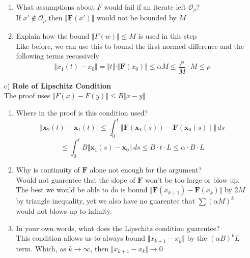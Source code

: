 \documentclass[12pt]{article}
\begin{document}
\begin{enumerate}
\begin{enumerate}
        \item What assumptions about $F$ would fail if an iterate left $\mathcal{O}_{\rho}$?\\
        If $x' \notin \mathcal{O}_{\rho}$ then $\Vert \mathbf{F}(x') \Vert$ would not be bounded by $M$

        \item Explain how the bound $\Vert F(w) \Vert \leq M$ is used in this step \\
        Like before, we can use this to bound the first normed difference and the following terms recussively
        \[\Vert x_1(t) - x_0 \Vert = \Vert t \Vert \cdot \Vert \mathbf{F}(x_0) \Vert \leq \alpha M \leq \frac{\rho}{M} \cdot M \leq \rho\]

    \end{enumerate}

    \item[c)] \textbf{Role of Lipschitz Condition} \\
    The proof uses $\Vert F(x) - F(y) \Vert \leq B \Vert x - y \Vert$
    \begin{enumerate}
        \item Where in the proof is this condition used? \\
        \[\Vert \mathbf{x}_2(t) - \mathbf{x}_1(t) \Vert \leq \int_{0}^{t} \Vert \mathbf{F}(\mathbf{x}_1(s)) - \mathbf{F}(\mathbf{x}_0(s)) \Vert \, ds \]
        \[ \leq \int_{0}^{t} B \Vert \mathbf{x}_1(s) - \mathbf{x}_0 \Vert \, ds \leq B \cdot t \cdot L \leq \alpha \cdot B \cdot L\]

        \item Why is continuity of $\mathbf{F}$ alone not enough for the argument? \\
        Would not guarentee that the slope of $\mathbf{F}$ won't be too large or blow up.
        The best we would be able to do is bound $\Vert \mathbf{F}(x_{k+1}) - \mathbf{F}(x_k) \Vert$ by 2$M$ by triangle inequality,
        yet we also have no guarentee that $\sum (\alpha M)^k$ would not blows up to infinity.

        \item In your own words, what does the Lipschitz condition guarentee?\\
        This condition allows us to always bound $\Vert x_{k+1} - x_{k} \Vert$ by the $(\alpha B)^k L$ term.
        Which, as $k \rightarrow \infty$, then $\Vert x_{k+1} - x_{k} \Vert \rightarrow 0$

    \end{enumerate}


\end{enumerate}
\end{document}

